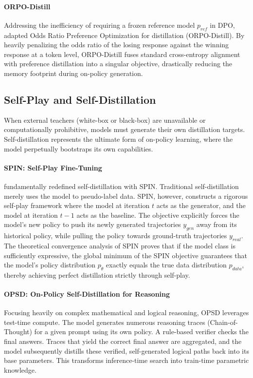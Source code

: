 \documentclass{article} %
\begin{document}
\paragraph{ORPO-Distill}
Addressing the inefficiency of requiring a frozen reference model $p_{ref}$ in DPO, \citet{2509.25100} adapted Odds Ratio Preference Optimization for distillation (ORPO-Distill). By heavily penalizing the odds ratio of the losing response against the winning response at a token level, ORPO-Distill fuses standard cross-entropy alignment with preference distillation into a singular objective, drastically reducing the memory footprint during on-policy generation.

\subsection{Self-Play and Self-Distillation}
\label{subsec:self_distill}

When external teachers (white-box or black-box) are unavailable or computationally prohibitive, models must generate their own distillation targets. Self-distillation represents the ultimate form of on-policy learning, where the model perpetually bootstraps its own capabilities.

\paragraph{SPIN: Self-Play Fine-Tuning}
\citet{2401.01335} fundamentally redefined self-distillation with SPIN. Traditional self-distillation merely uses the model to pseudo-label data. SPIN, however, constructs a rigorous self-play framework where the model at iteration $t$ acts as the generator, and the model at iteration $t-1$ acts as the baseline. The objective explicitly forces the model's new policy to push its newly generated trajectories $y_{gen}$ away from its historical policy, while pulling the policy towards ground-truth trajectories $y_{real}$. 
The theoretical convergence analysis of SPIN proves that if the model class is sufficiently expressive, the global minimum of the SPIN objective guarantees that the model's policy distribution $p_\theta$ exactly equals the true data distribution $p_{data}$, thereby achieving perfect distillation strictly through self-play.

\paragraph{OPSD: On-Policy Self-Distillation for Reasoning}
Focusing heavily on complex mathematical and logical reasoning, OPSD \citep{2601.18734} leverages test-time compute. The model generates numerous reasoning traces (Chain-of-Thought) for a given prompt using its own policy. A rule-based verifier checks the final answers. Traces that yield the correct final answer are aggregated, and the model subsequently distills these verified, self-generated logical paths back into its base parameters. This transforms inference-time search into train-time parametric knowledge.
\end{document}
